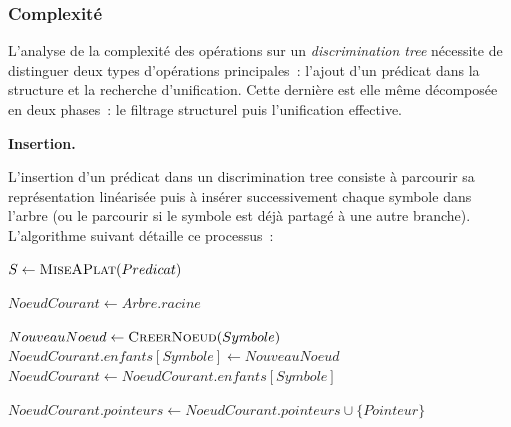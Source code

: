 \documentclass[11pt]{article}
\newenvironment{paraph}[1]{%
  \medskip
  \noindent\textbf{#1.}\quad

  \vspace{0.2cm}
}{%
  \medskip
}
\begin{document}
\subsubsection{Complexité}

L'analyse de la complexité des opérations sur un \textit{discrimination tree}
nécessite de distinguer deux types d'opérations principales~: l'ajout d'un prédicat dans
la structure et la recherche d'unification. Cette dernière est elle même décomposée en deux phases~: 
le filtrage structurel puis l'unification effective.

\begin{paraph}{Insertion}
    L'insertion d'un prédicat dans un discrimination tree consiste à parcourir sa représentation
    linéarisée puis à insérer successivement chaque symbole dans l'arbre (ou le parcourir si le symbole
    est déjà partagé à une autre branche). L'algorithme suivant détaille ce processus~:

    \begin{algorithm}[H]
        \footnotesize
        \caption{Insertion d'un prédicat dans l'arbre de discrimination}\label{alg:insertion_dt}
        \begin{algorithmic}[1]
            
                
                \vspace{0.1cm}
                \State{}
                \State$S \gets \Call{MiseAPlat}{Predicat}$ 
                
                \vspace{0.1cm}
                \State{}
                \State$NoeudCourant \gets Arbre.racine$
                
                        \State{}
                        \State$NouveauNoeud \gets \Call{CreerNoeud}{Symbole}$
                        \State$NoeudCourant.enfants[Symbole] \gets NouveauNoeud$
                    \EndIf
                    \State$NoeudCourant \gets NoeudCourant.enfants[Symbole]$
                \EndFor
                
                \vspace{0.1cm}
                \State{}
                    \State$NoeudCourant.pointeurs \gets NoeudCourant.pointeurs \cup \{Pointeur\}$
                \EndIf
                

\end{algorithmic}
\end{algorithm}
\end{paraph}
\end{document}
